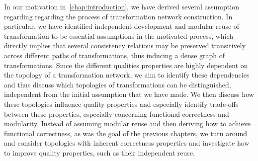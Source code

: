 In our motivation in~\autoref{chap:introduction}, we have derived several assumption regarding regarding the process of transformation network construction.
In particular, we have identified independent development and modular reuse of transformation to be essential assumptions in the motivated process, which directly implies that several consistency relations may be preserved transitively across different paths of transformations, thus inducing a dense graph of transformations.
Since the different qualities properties are highly dependent on the topology of a transformation network, we aim to identify these dependencies and thus discuss which topologies of transformations can be distinguished, independent from the initial assumption that we have made.
We then discuss how these topologies influence quality properties and especially identify trade-offs between these properties, especially concerning functional correctness and modularity.
Instead of assuming modular reuse and then deriving how to achieve functional correctness, as was the goal of the previous chapters, we turn around and consider topologies with inherent correctness properties and investigate how to improve quality properties, such as their independent reuse.





